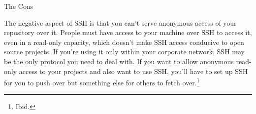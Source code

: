 \vspace{20pt}
\noindent\begin{bf}The Cons\end{bf}
The negative aspect of SSH is that you can’t serve anonymous
access of your repository over it.  People must have access to
your machine over SSH to access it, even in a read-only capacity,
which doesn’t make SSH access conducive to open source projects.
If you’re using it only within your corporate network, SSH may be
the only protocol you need to deal with.  If you want to allow
anonymous read-only access to your projects and also want to use
SSH, you’ll have to set up SSH for you to push over but something
else for others to fetch over.\footnote{Ibid.}
